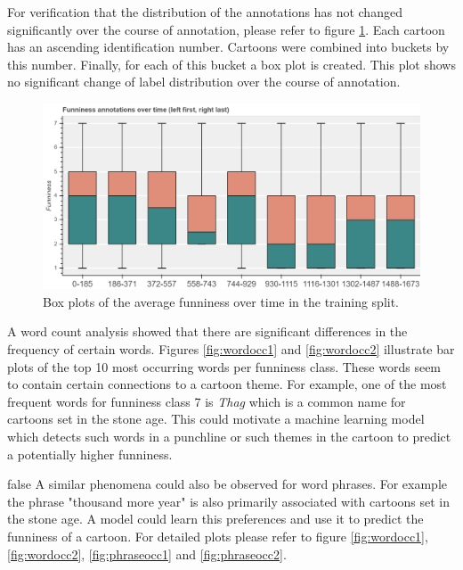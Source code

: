 \documentclass[draft,final,oneside]{vutinfth} %
\begin{document}
For verification that the distribution of the annotations has not changed significantly over the course of annotation, please refer to figure \ref{fig:boxplottime}. Each cartoon has an ascending identification number. Cartoons were  combined into buckets by this number. Finally, for each of this bucket a box plot is created. This plot shows no significant change of label distribution over the course of annotation.

\begin{figure}
	\centering
  	\includegraphics[width=1.0\textwidth]{graphics/average_funniness_over_time}
	\caption{Box plots of the average funniness over time in the training split.}
	\label{fig:boxplottime}
\end{figure}

A word count analysis showed that there are significant differences in the frequency of certain words. Figures \ref{fig:wordocc1} and \ref{fig:wordocc2} illustrate bar plots of the top 10 most occurring words per funniness class. These words seem to contain certain connections to a cartoon theme. For example, one of the most frequent words for funniness class 7 is \textit{Thag} which is a common name for cartoons set in the stone age. This could motivate a machine learning model which detects such words in a punchline or such themes in the cartoon to predict a potentially higher funniness.

\if false 
A similar phenomena could also be observed for word phrases. For example the phrase "thousand more year" is also primarily associated with cartoons set in the stone age. A model could learn this preferences and use it to predict the funniness of a cartoon. For detailed plots please refer to figure \ref{fig:wordocc1}, \ref{fig:wordocc2}, \ref{fig:phraseocc1} and \ref{fig:phraseocc2}.
\fi
\end{document}
